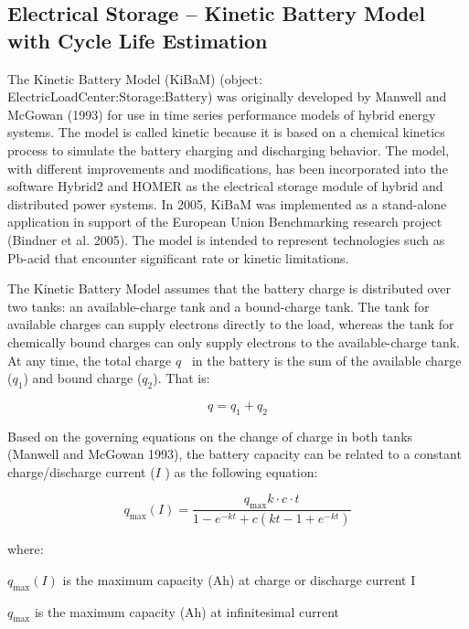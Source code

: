 \subsection{Electrical Storage -- Kinetic Battery Model with Cycle Life Estimation}\label{electrical-storage-kinetic-battery-model}

The Kinetic Battery Model (KiBaM) (object: ElectricLoadCenter:Storage:Battery) was originally developed by Manwell and McGowan (1993) for use in time series performance models of hybrid energy systems. The model is called kinetic because it is based on a chemical kinetics process to simulate the battery charging and discharging behavior. The model, with different improvements and modifications, has been incorporated into the software Hybrid2 and HOMER as the electrical storage module of hybrid and distributed power systems. In 2005, KiBaM was implemented as a stand-alone application in support of the European Union Benchmarking research project (Bindner et al. 2005). The model is intended to represent technologies such as Pb-acid that encounter significant rate or kinetic limitations.

The Kinetic Battery Model assumes that the battery charge is distributed over two tanks: an available-charge tank and a bound-charge tank. The tank for available charges can supply electrons directly to the load, whereas the tank for chemically bound charges can only supply electrons to the available-charge tank. At any time, the total charge \(q\) ~in the battery is the sum of the available charge (\({q_1}\)) and bound charge (\({q_2}\)). That is:

\begin{equation}
q = {q_1} + {q_2}
\end{equation}

Based on the governing equations on the change of charge in both tanks (Manwell and McGowan 1993), the battery capacity can be related to a constant charge/discharge current (\(I\) ) as the following equation:

\begin{equation}
{q_{\max }}(I) = \frac{{{q_{\max }}k \cdot c \cdot t}}{{1 - {e^{ - kt}} + c(kt - 1 + {e^{ - kt}})}}
\end{equation}

where:

\({q_{\max }}(I)\) is the maximum capacity (Ah) at charge or discharge current I

\({q_{\max }}\) is the maximum capacity (Ah) at infinitesimal current

